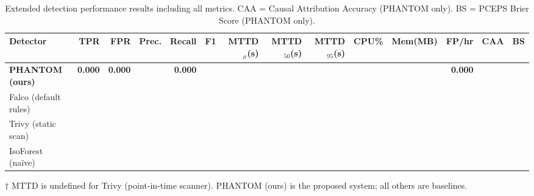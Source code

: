\begin{table}[h]
\centering
\caption{Extended detection performance results including all metrics. CAA = Causal Attribution Accuracy (PHANTOM only). BS = PCEPS Brier Score (PHANTOM only).}
\label{tab:detection_performance_extended}
\begin{tabular}{lrrrrrrrrrrrrr}
\hline
Detector & TPR & FPR & Prec. & Recall & F1 & MTTD$_\mu$(s) & MTTD$_{50}$(s) & MTTD$_{95}$(s) & CPU\% & Mem(MB) & FP/hr & CAA & BS \\
\hline
\textbf{PHANTOM (ours)} & \textbf{0.000} & \textbf{0.000} & \text{---} & \textbf{0.000} & \text{---} & \text{---} & \text{---} & \text{---} & \text{---} & \text{---} & \textbf{0.000} & \text{---} & \text{---} \\
Falco (default rules) & \text{---} & \text{---} & \text{---} & \text{---} & \text{---} & \text{---} & \text{---} & \text{---} & \text{---} & \text{---} & \text{---} & \text{---} & \text{---} \\
Trivy (static scan) & \text{---} & \text{---} & \text{---} & \text{---} & \text{---} & \text{---} & \text{---} & \text{---} & \text{---} & \text{---} & \text{---} & \text{---} & \text{---} \\
IsoForest (na\"{i}ve) & \text{---} & \text{---} & \text{---} & \text{---} & \text{---} & \text{---} & \text{---} & \text{---} & \text{---} & \text{---} & \text{---} & \text{---} & \text{---} \\
\hline
\end{tabular}
\vspace{0.5em}
\footnotesize{$\dagger$ MTTD is undefined for Trivy (point-in-time scanner). PHANTOM (ours) is the proposed system; all others are baselines.}
\end{table}